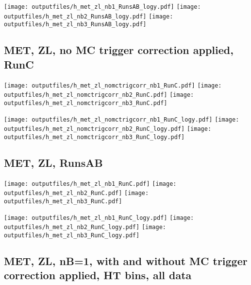 \documentclass[11pt]{article}
\begin{document}
    \noindent
     \texttt{[image: outputfiles/h\_met\_zl\_nb1\_RunsAB\_logy.pdf]}
     \texttt{[image: outputfiles/h\_met\_zl\_nb2\_RunsAB\_logy.pdf]}
     \texttt{[image: outputfiles/h\_met\_zl\_nb3\_RunsAB\_logy.pdf]}




     \subsection{ MET, ZL, no MC trigger correction applied, RunC}

    \noindent
     \texttt{[image: outputfiles/h\_met\_zl\_nomctrigcorr\_nb1\_RunC.pdf]}
     \texttt{[image: outputfiles/h\_met\_zl\_nomctrigcorr\_nb2\_RunC.pdf]}
     \texttt{[image: outputfiles/h\_met\_zl\_nomctrigcorr\_nb3\_RunC.pdf]}

    \noindent
     \texttt{[image: outputfiles/h\_met\_zl\_nomctrigcorr\_nb1\_RunC\_logy.pdf]}
     \texttt{[image: outputfiles/h\_met\_zl\_nomctrigcorr\_nb2\_RunC\_logy.pdf]}
     \texttt{[image: outputfiles/h\_met\_zl\_nomctrigcorr\_nb3\_RunC\_logy.pdf]}


     \subsection{ MET, ZL, RunsAB}

    \noindent
     \texttt{[image: outputfiles/h\_met\_zl\_nb1\_RunC.pdf]}
     \texttt{[image: outputfiles/h\_met\_zl\_nb2\_RunC.pdf]}
     \texttt{[image: outputfiles/h\_met\_zl\_nb3\_RunC.pdf]}

    \noindent
     \texttt{[image: outputfiles/h\_met\_zl\_nb1\_RunC\_logy.pdf]}
     \texttt{[image: outputfiles/h\_met\_zl\_nb2\_RunC\_logy.pdf]}
     \texttt{[image: outputfiles/h\_met\_zl\_nb3\_RunC\_logy.pdf]}





     \subsection{ MET, ZL, nB=1, with and without MC trigger correction applied, HT bins, all data}
\end{document}
